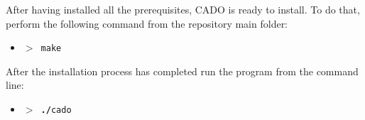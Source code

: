 \documentclass[
12pt, %
a4paper, %
oneside, %
headinclude,footinclude, %
BCOR5mm, %
]{scrartcl}
\begin{document}
After having installed all the prerequisites, CADO is ready to install. To do that, perform the following command from the repository main folder:
\begin{itemize}
\item[] \texttt{\textbf{$>$ }make}
\end{itemize}
After the installation process has completed run the program from the command line:
\begin{itemize}
\item[] \texttt{\textbf{$>$ ./}cado}
\end{itemize}
\end{document}
